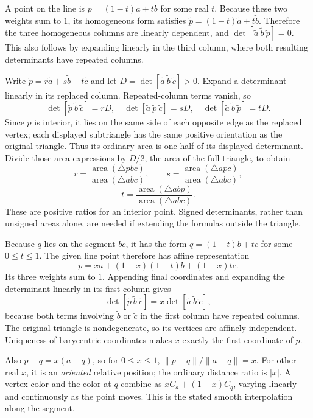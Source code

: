 A point on the line is $p=(1-t)a+tb$ for some real $t$. Because these two weights sum to $1$, its homogeneous form satisfies $\widetilde p=(1-t)\widetilde a+t\widetilde b$. Therefore the three homogeneous columns are linearly dependent, and $\det[\widetilde a\ \widetilde b\ \widetilde p]=0$. This also follows by expanding linearly in the third column, where both resulting determinants have repeated columns.

Write $\widetilde p=r\widetilde a+s\widetilde b+t\widetilde c$ and let $D=\det[\widetilde a\ \widetilde b\ \widetilde c]>0$. Expand a determinant linearly in its replaced column. Repeated-column terms vanish, so
\[
\det[\widetilde p\ \widetilde b\ \widetilde c]=rD,\quad
\det[\widetilde a\ \widetilde p\ \widetilde c]=sD,\quad
\det[\widetilde a\ \widetilde b\ \widetilde p]=tD.
\]
Since $p$ is interior, it lies on the same side of each opposite edge as the replaced vertex; each displayed subtriangle has the same positive orientation as the original triangle. Thus its ordinary area is one half of its displayed determinant. Divide those area expressions by $D/2$, the area of the full triangle, to obtain
\[
r=\frac{\operatorname{area}(\triangle pbc)}{\operatorname{area}(\triangle abc)},\qquad
s=\frac{\operatorname{area}(\triangle apc)}{\operatorname{area}(\triangle abc)},
\]
\[
t=\frac{\operatorname{area}(\triangle abp)}{\operatorname{area}(\triangle abc)}.
\]
These are positive ratios for an interior point. Signed determinants, rather than unsigned areas alone, are needed if extending the formulas outside the triangle.

Because $q$ lies on the segment $bc$, it has the form $q=(1-t)b+tc$ for some $0\le t\le1$. The given line point therefore has affine representation
\[
p=x a+(1-x)(1-t)b+(1-x)t c.
\]
Its three weights sum to $1$. Appending final coordinates and expanding the determinant linearly in its first column gives
\[
\det[\widetilde p\ \widetilde b\ \widetilde c]
=x\det[\widetilde a\ \widetilde b\ \widetilde c],
\]
because both terms involving $\widetilde b$ or $\widetilde c$ in the first column have repeated columns. The original triangle is nondegenerate, so its vertices are affinely independent. Uniqueness of barycentric coordinates makes $x$ exactly the first coordinate of $p$.

Also $p-q=x(a-q)$, so for $0\le x\le1$, $\|p-q\|/\|a-q\|=x$. For other real $x$, it is an \emph{oriented} relative position; the ordinary distance ratio is $|x|$. A vertex color and the color at $q$ combine as $xC_a+(1-x)C_q$, varying linearly and continuously as the point moves. This is the stated smooth interpolation along the segment.
